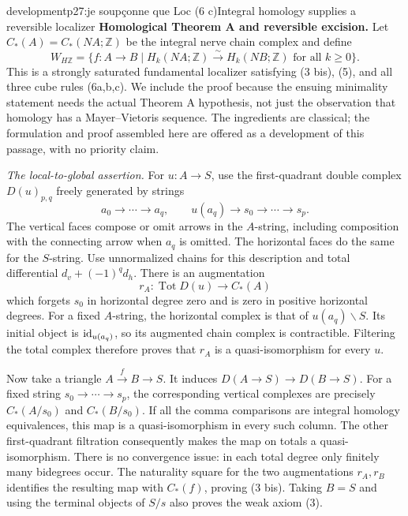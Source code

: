 \begin{dcomment}{development}{p27:je soupçonne que Loc (6 c)}{Integral homology supplies a reversible localizer}
\textbf{Homological Theorem A and reversible excision.}\ours
Let $C_*(A)=C_*(NA;\mathbb Z)$ be the integral nerve chain complex and define
\[
W_{H\mathbb Z}=\{f:A\to B\mid H_k(NA;\mathbb Z)\xrightarrow{\sim}
H_k(NB;\mathbb Z)\text{ for all }k\geq0\}.
\]
This is a strongly saturated fundamental localizer satisfying (3 bis), (5), and all three cube rules (6a,b,c). We include the proof because the ensuing minimality statement needs the actual Theorem A hypothesis, not just the observation that homology has a Mayer--Vietoris sequence. The ingredients are classical; the formulation and proof assembled here are offered as a development of this passage, with no priority claim.

\emph{The local-to-global assertion.} For $u:A\to S$, use the first-quadrant double complex $D(u)_{p,q}$ freely generated by strings
\[
a_0\longrightarrow\cdots\longrightarrow a_q,
\qquad u(a_q)\longrightarrow s_0\longrightarrow\cdots\longrightarrow s_p.
\]
The vertical faces compose or omit arrows in the $A$-string, including composition with the connecting arrow when $a_q$ is omitted. The horizontal faces do the same for the $S$-string. Use unnormalized chains for this description and total differential $d_v+(-1)^q d_h$. There is an augmentation
\[
r_A:\operatorname{Tot}D(u)\longrightarrow C_*(A)
\]
which forgets $s_0$ in horizontal degree zero and is zero in positive horizontal degrees. For a fixed $A$-string, the horizontal complex is that of $u(a_q)\backslash S$. Its initial object is $\mathrm{id}_{u(a_q)}$, so its augmented chain complex is contractible. Filtering the total complex therefore proves that $r_A$ is a quasi-isomorphism for every $u$.

Now take a triangle $A\xrightarrow{f}B\to S$. It induces $D(A\to S)\to D(B\to S)$. For a fixed string $s_0\to\cdots\to s_p$, the corresponding vertical complexes are precisely $C_*(A/s_0)$ and $C_*(B/s_0)$. If all the comma comparisons are integral homology equivalences, this map is a quasi-isomorphism in every such column. The other first-quadrant filtration consequently makes the map on totals a quasi-isomorphism. There is no convergence issue: in each total degree only finitely many bidegrees occur. The naturality square for the two augmentations $r_A,r_B$ identifies the resulting map with $C_*(f)$, proving (3 bis). Taking $B=S$ and using the terminal objects of $S/s$ also proves the weak axiom (3).


\end{dcomment}
